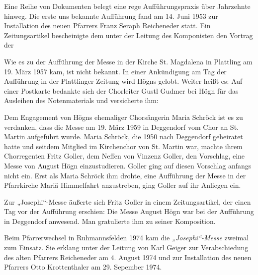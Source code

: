 Eine Reihe von Dokumenten belegt eine rege Aufführungspraxis über
Jahrzehnte hinweg. Die erste uns bekannte Aufführung fand am 14. Juni
1953 zur Installation des neuen Pfarrers Franz Seraph Reicheneder
statt. Ein Zeitungsartikel bescheinigte dem
 unter der Leitung des Komponisten
den  Vortrag der 

Wie es zu der Aufführung der Messe in der Kirche St. Magdalena in
Plattling am 19. März 1957 kam, ist nicht bekannt. In einer
Ankündigung am Tag der Aufführung in der Plattlinger Zeitung wird Högns
 gelobt.
Weiter heißt es:  Auf einer
Postkarte bedankte sich der Chorleiter Gustl Gudmer bei Högn für das
Ausleihen des Notenmaterials und versicherte ihm:  

Dem Engagement von Högns ehemaliger Chorsängerin Maria Schröck ist es zu
verdanken, dass die Messe am 19. März 1959 in Deggendorf vom Chor an
St. Martin aufgeführt wurde. Maria Schröck, die 1950 nach Deggendorf
geheiratet hatte und seitdem Mitglied im Kirchenchor von St. Martin
war, machte ihrem Chorregenten Fritz Goller, dem Neffen von Vinzenz
Goller, den Vorschlag, eine Messe von August Högn einzustudieren.
Goller ging auf diesen Vorschlag anfangs nicht ein. Erst als Maria
Schröck ihm drohte, eine Aufführung der Messe in der Pfarrkirche Mariä
Himmelfahrt anzustreben, ging Goller auf ihr Anliegen ein.

Zur „Josephi“-Messe äußerte sich Fritz Goller in einem Zeitungsartikel,
der einen Tag vor der Aufführung erschien: \zitat{}Die
Messe  August Högn war bei der Aufführung in Deggendorf
anwesend. Man gratulierte ihm zu seiner Komposition.

Beim Pfarrerwechsel in Ruhmannsfelden 1974 kam die
\textit{„Josephi“-Messe} zweimal zum Einsatz. Sie erklang unter der
Leitung von Karl Geiger zur Verabschiedung des alten Pfarrers
Reicheneder am 4. August 1974 und zur Installation des neuen Pfarrers
Otto Krottenthaler am 29. Sepember 1974.

